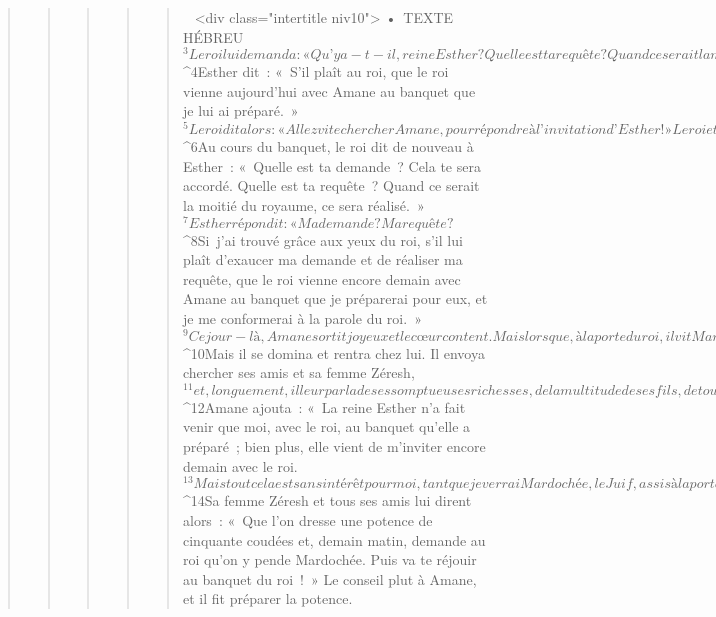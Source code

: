 \begin{verse}
\begin{verse}
\begin{verse}
\begin{verse}
\begin{verse}
         
      <div class="intertitle niv10">
        • TEXTE HÉBREU
${}^{3}Le roi lui demanda : « Qu’y a-t-il, reine Esther ? Quelle est ta requête ? Quand ce serait la moitié du royaume, cela te serait accordé. » 
${}^{4}Esther dit : « S’il plaît au roi, que le roi vienne aujourd’hui avec Amane au banquet que je lui ai préparé. » 
${}^{5}Le roi dit alors : « Allez vite chercher Amane, pour répondre à l’invitation d’Esther ! »
      Le roi et Amane vinrent au banquet préparé par Esther. 
${}^{6}Au cours du banquet, le roi dit de nouveau à Esther : « Quelle est ta demande ? Cela te sera accordé. Quelle est ta requête ? Quand ce serait la moitié du royaume, ce sera réalisé. » 
${}^{7}Esther répondit : « Ma demande ? Ma requête ? 
${}^{8}Si j’ai trouvé grâce aux yeux du roi, s’il lui plaît d’exaucer ma demande et de réaliser ma requête, que le roi vienne encore demain avec Amane au banquet que je préparerai pour eux, et je me conformerai à la parole du roi. »
${}^{9}Ce jour-là, Amane sortit joyeux et le cœur content. Mais lorsque, à la porte du roi, il vit Mardochée qui ne se levait pas et ne se dérangeait pas à sa vue, il fut rempli de fureur contre Mardochée. 
${}^{10}Mais il se domina et rentra chez lui. Il envoya chercher ses amis et sa femme Zéresh, 
${}^{11}et, longuement, il leur parla de ses somptueuses richesses, de la multitude de ses fils, de tout ce dont le roi l’avait comblé, pour l’élever et le mettre au-dessus de ses princes et de ses serviteurs. 
${}^{12}Amane ajouta : « La reine Esther n’a fait venir que moi, avec le roi, au banquet qu’elle a préparé ; bien plus, elle vient de m’inviter encore demain avec le roi. 
${}^{13}Mais tout cela est sans intérêt pour moi, tant que je verrai Mardochée, le Juif, assis à la porte du roi. » 
${}^{14}Sa femme Zéresh et tous ses amis lui dirent alors : « Que l’on dresse une potence de cinquante coudées et, demain matin, demande au roi qu’on y pende Mardochée. Puis va te réjouir au banquet du roi ! » Le conseil plut à Amane, et il fit préparer la potence.
      

\end{verse}
\end{verse}
\end{verse}
\end{verse}
\end{verse}
